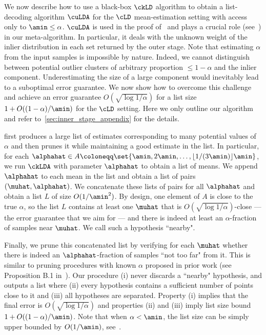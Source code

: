 We now describe how to use a black-box $\ckLD$ algorithm to obtain a list-decoding algorithm $\cuLDA$ for the $\cLD$ mean-estimation setting with access only to $\amin \leq \alpha$.
\(\cuLDA\) is used in the proof of~  and plays a crucial role (see~) in our meta-algorithm. In particular, it deals with the unknown weight of the inlier distribution in each set returned by the outer stage.
Note that 
estimating $\alpha$ from the input samples is impossible by nature. Indeed, we cannot distinguish between potential outlier clusters of arbitrary proportion $\leq 1-\alpha$ and the inlier component.
Underestimating the size of a large component would inevitably lead to a suboptimal error guarantee.
We now show how  to overcome this challenge and achieve an error guarantee
\(O(\sqrt{\log 1 / \alpha})\) for a list size \(1 + O((1 - \alpha) / \amin)\) for the $\cLD$ setting. Here we only outline our algorithm and refer to~\cref{sec:inner_stage_appendix} for the details.

 first produces a large list of estimates corresponding to many potential values of $\alpha$ and then prunes it while maintaining a good estimate in the list.
In particular, for each $\alphahat \in A \coloneqq \set{\amin,2\amin, \ldots,\lfloor 1/(3\amin) \rfloor \amin}$, we run \(\ckLDA\) with parameter $\alphahat$ to obtain a list of means.
We append $\alphahat$ to each mean in the list and obtain a list of pairs $(\muhat,\alphahat)$.
We concatenate these lists of pairs for all $\alphahat$ and obtain a list $L$ of size $O(1 / \amin^2)$.
By design, one element of $A$ is close to the true $\alpha$,
so the list $L$ contains at least one $\muhat$ that is $O(\sqrt{\log 1/\alpha})$-close ---  the error guarantee that we aim for --- and there is indeed at least an \(\alpha\)-fraction of samples near \(\muhat\).
We call such a hypothesis ``nearby".

Finally, we prune this concatenated list by verifying for each \(\muhat\) whether there is indeed an \(\alphahat\)-fraction of samples ``not too far" from it.
This is similar to pruning procedures with known $\alpha$ proposed in prior work (see Proposition B.1 in~\cite{diakonikolas2018list}).
Our procedure
(i) never discards a ``nearby" hypothesis, and outputs a list where (ii) every hypothesis contains a sufficient number of points close to it and (iii) all hypotheses are separated.
Property (i) implies that the final error is \(O(\sqrt{\log 1 / \alpha})\) and properties (ii) and (iii) imply list size bound \(1 + O((1 - \alpha) / \amin)\). Note that when $\alpha < \amin$, the list size can be simply upper bounded by $O(1/\amin)$, see~.

